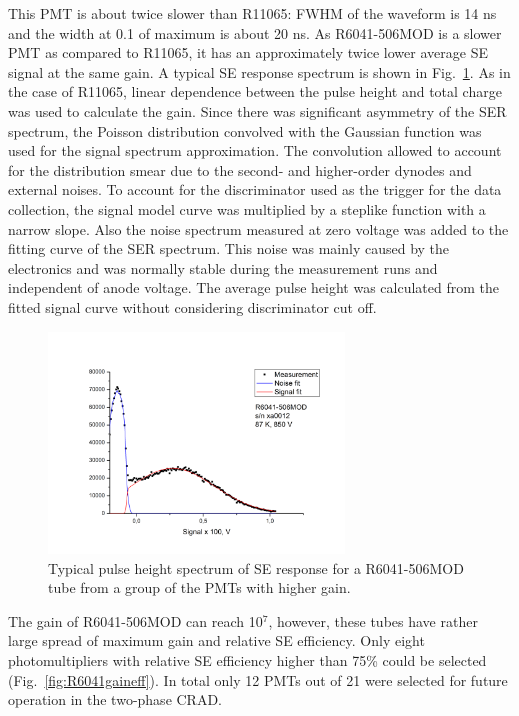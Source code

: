 \documentclass[a4paper,11pt]{article}
\begin{document}
This PMT is about twice slower than R11065: FWHM of the waveform is 14 ns and the width at 0.1 of maximum is about 20 ns. 
As R6041-506MOD is a slower PMT as compared to R11065, it has an approximately twice lower average SE signal at the same gain. 
A typical SE response spectrum is shown in Fig.~\ref{fig:R6041spectrum}. As in the case of R11065, linear dependence between the pulse height and total
charge was used to calculate the gain. Since there was significant asymmetry of the SER spectrum,
the Poisson distribution convolved with the Gaussian function was used for the signal spectrum
approximation. The convolution allowed to account for the distribution smear due to the second- and higher-order
dynodes and external noises. To account for the discriminator used as the trigger for the data
collection, the signal model curve was multiplied by a steplike function with a narrow slope. Also
the noise spectrum measured at zero voltage was added to the fitting curve of the SER spectrum.
This noise was mainly caused by the electronics and was normally stable during the measurement
runs and independent of anode voltage. The average pulse height was calculated from the fitted
signal curve without considering discriminator cut off.
\begin{figure}[htbp]
\centering
\includegraphics[width=0.7\textwidth,viewport=1 1 700 450,clip]{figures/R6041spectrum.png}
\caption{Typical pulse height spectrum of SE response for a R6041-506MOD tube from a group of the PMTs with higher gain.}
\label{fig:R6041spectrum}
\end{figure}
The gain of R6041-506MOD can reach 10$^7$, however, these tubes have rather large spread of  maximum gain and relative SE efficiency. 
Only eight photomultipliers  with  relative SE efficiency higher than 75\% could be selected (Fig.~\ref{fig:R6041gaineff}). In total only 12 PMTs 
out of 21 were selected for future operation in the two-phase CRAD. 
\end{document}
